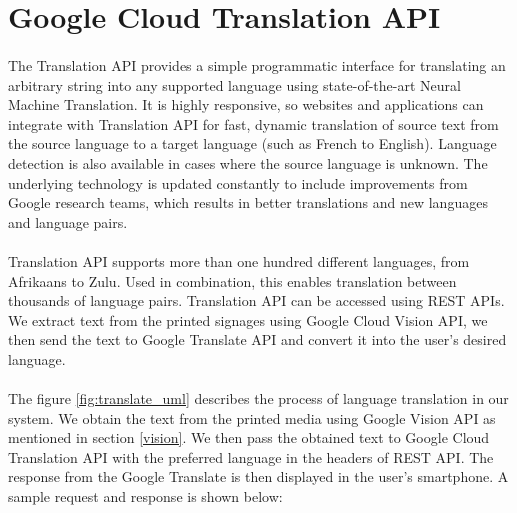 \documentclass[12pt]{article}
\begin{document}
\section{Google Cloud Translation API}
\label{translate}

\paragraph{}The Translation API provides a simple programmatic interface for translating an arbitrary string into any supported language using state-of-the-art Neural Machine Translation. It is highly responsive, so websites and applications can integrate with Translation API for fast, dynamic translation of source text from the source language to a target language (such as French to English). Language detection is also available in cases where the source language is unknown. The underlying technology is updated constantly to include improvements from Google research teams, which results in better translations and new languages and language pairs.

\paragraph{}Translation API supports more than one hundred different languages, from Afrikaans to Zulu. Used in combination, this enables translation between thousands of language pairs. Translation API can be accessed using REST APIs. We extract text from the printed signages using Google Cloud Vision API, we then send the text to Google Translate API and convert it into the user's desired language.

\paragraph{}The figure \ref{fig:translate_uml} describes the process of language translation in our system. We obtain the text from the printed media using Google Vision API as mentioned in section \ref{vision}. We then pass the obtained text to Google Cloud Translation API with the preferred language in the headers of REST API. The response from the Google Translate is then displayed in the user's smartphone. A sample request and response is shown below:
\end{document}
